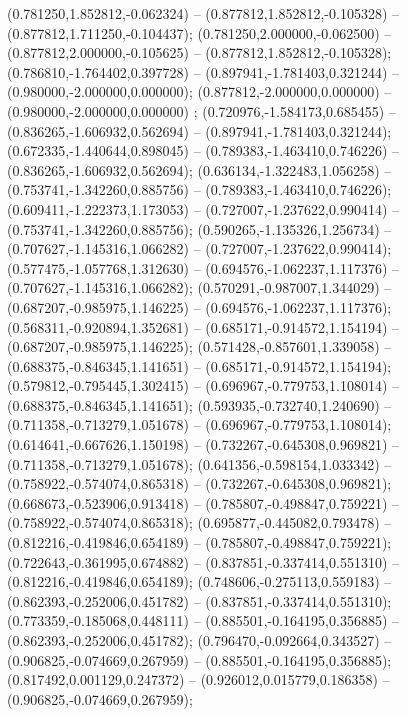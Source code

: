  (0.781250,1.852812,-0.062324) -- (0.877812,1.852812,-0.105328) -- (0.877812,1.711250,-0.104437);
 (0.781250,2.000000,-0.062500) -- (0.877812,2.000000,-0.105625) -- (0.877812,1.852812,-0.105328);
 (0.786810,-1.764402,0.397728) -- (0.897941,-1.781403,0.321244) -- (0.980000,-2.000000,0.000000);
 (0.877812,-2.000000,0.000000) -- (0.980000,-2.000000,0.000000) ;
 (0.720976,-1.584173,0.685455) -- (0.836265,-1.606932,0.562694) -- (0.897941,-1.781403,0.321244);
 (0.672335,-1.440644,0.898045) -- (0.789383,-1.463410,0.746226) -- (0.836265,-1.606932,0.562694);
 (0.636134,-1.322483,1.056258) -- (0.753741,-1.342260,0.885756) -- (0.789383,-1.463410,0.746226);
 (0.609411,-1.222373,1.173053) -- (0.727007,-1.237622,0.990414) -- (0.753741,-1.342260,0.885756);
 (0.590265,-1.135326,1.256734) -- (0.707627,-1.145316,1.066282) -- (0.727007,-1.237622,0.990414);
 (0.577475,-1.057768,1.312630) -- (0.694576,-1.062237,1.117376) -- (0.707627,-1.145316,1.066282);
 (0.570291,-0.987007,1.344029) -- (0.687207,-0.985975,1.146225) -- (0.694576,-1.062237,1.117376);
 (0.568311,-0.920894,1.352681) -- (0.685171,-0.914572,1.154194) -- (0.687207,-0.985975,1.146225);
 (0.571428,-0.857601,1.339058) -- (0.688375,-0.846345,1.141651) -- (0.685171,-0.914572,1.154194);
 (0.579812,-0.795445,1.302415) -- (0.696967,-0.779753,1.108014) -- (0.688375,-0.846345,1.141651);
 (0.593935,-0.732740,1.240690) -- (0.711358,-0.713279,1.051678) -- (0.696967,-0.779753,1.108014);
 (0.614641,-0.667626,1.150198) -- (0.732267,-0.645308,0.969821) -- (0.711358,-0.713279,1.051678);
 (0.641356,-0.598154,1.033342) -- (0.758922,-0.574074,0.865318) -- (0.732267,-0.645308,0.969821);
 (0.668673,-0.523906,0.913418) -- (0.785807,-0.498847,0.759221) -- (0.758922,-0.574074,0.865318);
 (0.695877,-0.445082,0.793478) -- (0.812216,-0.419846,0.654189) -- (0.785807,-0.498847,0.759221);
 (0.722643,-0.361995,0.674882) -- (0.837851,-0.337414,0.551310) -- (0.812216,-0.419846,0.654189);
 (0.748606,-0.275113,0.559183) -- (0.862393,-0.252006,0.451782) -- (0.837851,-0.337414,0.551310);
 (0.773359,-0.185068,0.448111) -- (0.885501,-0.164195,0.356885) -- (0.862393,-0.252006,0.451782);
 (0.796470,-0.092664,0.343527) -- (0.906825,-0.074669,0.267959) -- (0.885501,-0.164195,0.356885);
 (0.817492,0.001129,0.247372) -- (0.926012,0.015779,0.186358) -- (0.906825,-0.074669,0.267959);
